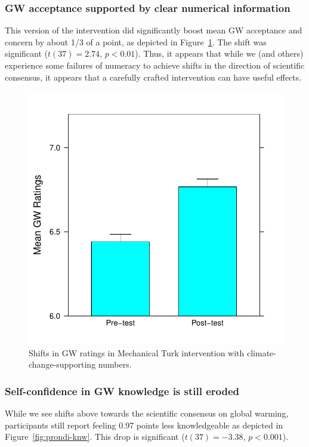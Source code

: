 \subsubsection{GW acceptance supported by clear numerical information}

This version of the intervention did significantly boost mean GW acceptance and
concern by about 1/3 of a point, as depicted in Figure~\ref{fig:prondi-gw}. The
shift was significant ($t(37) = 2.74$, $p < 0.01$). Thus, it appears that while
we (and others) experience some failures of numeracy to achieve shifts in the
direction of scientific consensus, it appears that a carefully crafted
intervention can have useful effects.

\begin{figure}
    \centering
    \includegraphics{CCO-prondi-gw.pdf}
    \caption{Shifts in GW ratings in Mechanical Turk intervention with
        climate-change-supporting numbers.}
    \label{fig:prondi-gw}
\end{figure}

\subsubsection{Self-confidence in GW knowledge is still eroded}

While we see shifts above towards the scientific consensus on global warming,
participants still report feeling 0.97 points less knowledgeable as depicted in
Figure~\ref{fig:prondi-knw}. This drop is significant ($t(37)=-3.38$, $p<0.001$).

